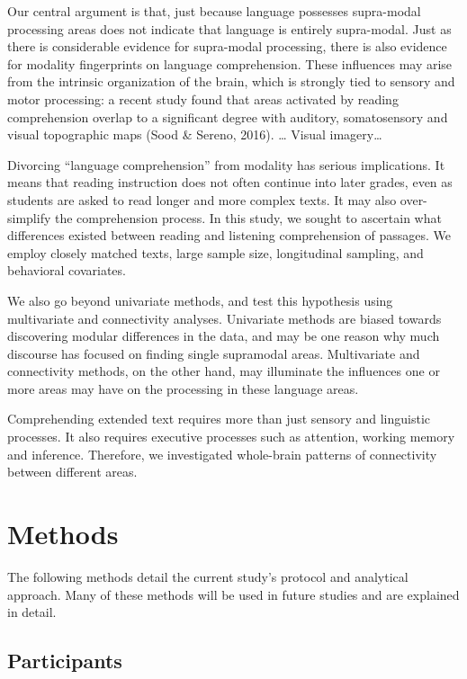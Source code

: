 Our central argument is that, just because language possesses supra-modal processing areas does not indicate that language is entirely supra-modal. Just as there is considerable evidence for supra-modal processing, there is also evidence for modality fingerprints on language comprehension. These influences may arise from the intrinsic organization of the brain, which is strongly tied to sensory and motor processing: a recent study found that areas activated by reading comprehension overlap to a significant degree with auditory, somatosensory and visual topographic maps (Sood \& Sereno, 2016). … Visual imagery… 

Divorcing “language comprehension” from modality has serious implications. It means that reading instruction does not often continue into later grades, even as students are asked to read longer and more complex texts. It may also over-simplify the comprehension process. 
In this study, we sought to ascertain what differences existed between reading and listening comprehension of passages. We employ closely matched texts, large sample size, longitudinal sampling, and behavioral covariates. 

We also go beyond univariate methods, and test this hypothesis using multivariate and connectivity analyses. Univariate methods are biased towards discovering modular differences in the data, and may be one reason why much discourse has focused on finding single supramodal areas. Multivariate and connectivity methods, on the other hand, may illuminate the influences one or more areas may have on the processing in these language areas. 

Comprehending extended text requires more than just sensory and linguistic processes. It also requires executive processes such as attention, working memory and inference. Therefore, we investigated whole-brain patterns of connectivity between different areas. 



\section{Methods}

The following methods detail the current study's protocol and analytical approach. Many of these methods will be used in future studies and are explained in detail. 

\subsection{Participants}

